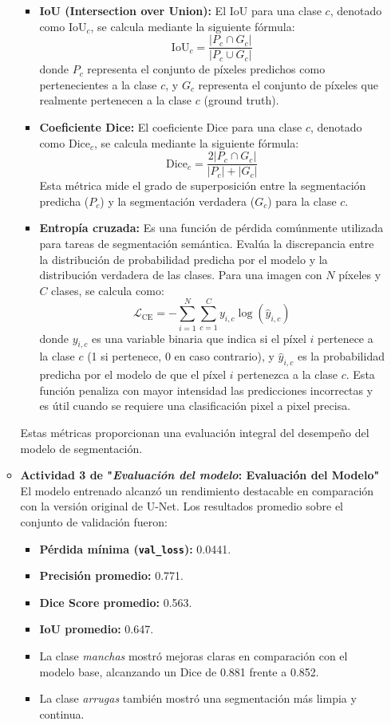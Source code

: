 \begin{enumerate}
\begin{itemize}
\begin{itemize}
  \item \textbf{IoU (Intersection over Union):} El IoU para una clase $c$, denotado como $\text{IoU}_c$, se calcula mediante la siguiente fórmula:
$$\text{IoU}_c = \frac{|P_c \cap G_c|}{|P_c \cup G_c|}$$
donde $P_c$ representa el conjunto de píxeles predichos como pertenecientes a la clase $c$, y $G_c$ representa el conjunto de píxeles que realmente pertenecen a la clase $c$ (ground truth).

  \item \textbf{Coeficiente Dice:} El coeficiente Dice para una clase $c$, denotado como $\text{Dice}_c$, se calcula mediante la siguiente fórmula:
$$\text{Dice}_c = \frac{2|P_c \cap G_c|}{|P_c| + |G_c|}$$
Esta métrica mide el grado de superposición entre la segmentación predicha ($P_c$) y la segmentación verdadera ($G_c$) para la clase $c$.
 

  \item \textbf{Entropía cruzada:} Es una función de pérdida comúnmente utilizada para tareas de segmentación semántica. Evalúa la discrepancia entre la distribución de probabilidad predicha por el modelo y la distribución verdadera de las clases. Para una imagen con $N$ píxeles y $C$ clases, se calcula como:
$$\mathcal{L}_{\text{CE}} = -\sum_{i=1}^{N} \sum_{c=1}^{C} y_{i,c} \log(\hat{y}_{i,c})$$
donde $y_{i,c}$ es una variable binaria que indica si el píxel $i$ pertenece a la clase $c$ (1 si pertenece, 0 en caso contrario), y $\hat{y}_{i,c}$ es la probabilidad predicha por el modelo de que el píxel $i$ pertenezca a la clase $c$. Esta función penaliza con mayor intensidad las predicciones incorrectas y es útil cuando se requiere una clasificación pixel a pixel precisa.
\end{itemize}

Estas métricas proporcionan una evaluación integral del desempeño del modelo de segmentación.



  \item\textbf{Actividad 3 de "\textit{Evaluación del modelo}: Evaluación del Modelo"}
  El modelo entrenado alcanzó un rendimiento destacable en comparación con la versión original de U-Net. Los resultados promedio sobre el conjunto de validación fueron:

\begin{itemize}
\item \textbf{Pérdida mínima (\texttt{val\_loss}):} 0.0441.
\item \textbf{Precisión promedio:} 0.771.
\item \textbf{Dice Score promedio:} 0.563.
\item \textbf{IoU promedio:} 0.647.
\item La clase \emph{manchas} mostró mejoras claras en comparación con el modelo base, alcanzando un Dice de 0.881 frente a 0.852.
\item La clase \emph{arrugas} también mostró una segmentación más limpia y continua.


\end{itemize}
\end{itemize}
\end{enumerate}
